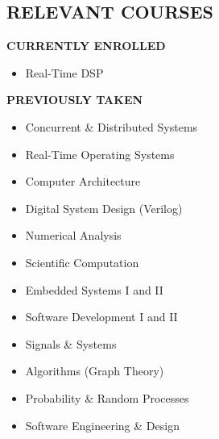 \documentclass[margin]{res}
\begin{document}
\begin{resume}
  \section{RELEVANT COURSES}
  \vspace{-.125em}
  {\footnotesize\textbf{CURRENTLY ENROLLED}}
  \vspace{-.75em}
  \begin{multicols}{2}
    \begin{itemize}
      \item Real-Time DSP
    \end{itemize}
  \end{multicols}
  \vspace{-1.5em}
  {\footnotesize\textbf{PREVIOUSLY TAKEN}}
  \vspace{-.75em}
  \begin{multicols}{2}
    \begin{itemize}
    \item Concurrent \& Distributed Systems
    \item Real-Time Operating Systems
    \item Computer Architecture
    \item Digital System Design (Verilog)
    \item Numerical Analysis
    \item Scientific Computation
    \item Embedded Systems I and II
    \item Software Development I and II
    \item Signals \& Systems
    \item Algorithms (Graph Theory)
    \item Probability \& Random Processes
    \item Software Engineering \& Design
    \end{itemize}
  \end{multicols}


\end{resume}
\end{document}
